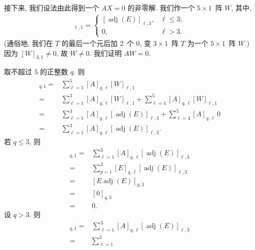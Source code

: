 \documentclass[../libro.tex]{subfiles}
\begin{document}
\begin{example}
    接下来, 我们设法由此得到一个 \(AX = 0\)
    的非零解.
    我们作一个 \(5 \times 1\)~阵 \(W\), 其中,
    \begin{align*}
        [W]_{\ell,1} =
        \begin{cases}
            [\operatorname{adj} {(E)}]_{\ell,3},
            & \ell \leq 3; \\
            0, & \ell > 3.
        \end{cases}
    \end{align*}
    (通俗地, 我们在 \(T\) 的最后一个元后加 \(2\)~个 \(0\), %
    变 \(3 \times 1\)~阵 \(T\)
    为一个 \(5 \times 1\)~阵 \(W\).) %
    因为 \([W]_{3,1} \neq 0\),
    故 \(W \neq 0\).
    我们证明 \(AW = 0\).

    取不超过 \(5\) 的正整数 \(q\).
    则
    \begin{align*}
        [AW]_{q,1}
        = {} &
        \sum_{\ell = 1}^{5}
        {[A]_{q,\ell} [W]_{\ell,1}}
        \\
        = {} &
        \sum_{\ell = 1}^{3}
        {[A]_{q,\ell} [W]_{\ell,1}}
        +
        \sum_{\ell = 4}^{5}
        {[A]_{q,\ell} [W]_{\ell,1}}
        \\
        = {} &
        \sum_{\ell = 1}^{3}
        {[A]_{q,\ell} [\operatorname{adj} {(E)}]_{\ell,3}}
        +
        \sum_{\ell = 4}^{5}
        {[A]_{q,\ell}\, 0}
        \\
        = {} &
        \sum_{\ell = 1}^{3}
        {[A]_{q,\ell} [\operatorname{adj} {(E)}]_{\ell,3}}.
    \end{align*}
    若 \(q \leq 3\), 则
    \begin{align*}
        [AW]_{q,1}
        = {} &
        \sum_{\ell=1}^{3}
        {[A]_{q,\ell}
        [\operatorname{adj} {(E)}]_{\ell,3}}
        \\
        = {} &
        \sum_{p=1}^{3}
        {[E]_{q,\ell}
        [\operatorname{adj} {(E)}]_{\ell,3}}
        \\
        = {} &
        [E \operatorname{adj} {(E)}]_{q,3}
        \\
        = {} &
        [0]_{q,3}
        \\
        = {} & 0.
    \end{align*}
    设 \(q > 3\).
    则
    \begin{align*}
        [AW]_{q,1}
        = {} &
        \sum_{\ell=1}^{3}
        {[A]_{q,\ell}
        [\operatorname{adj} {(E)}]_{\ell,3}}
        \\
        = {} &
        \sum_{\ell=1}^{3}

\end{align*}
\end{example}
\end{document}
